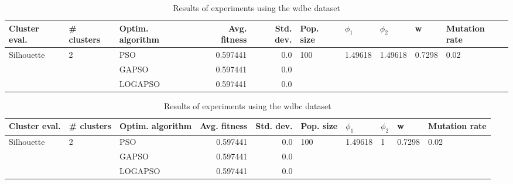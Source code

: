 \documentclass{article}
\begin{document}
\begin{table}
\centering
\caption{Results of experiments using the wdbc dataset}
\begin{tabular}{lllrrlllll}
\toprule
              Cluster eval. &        \# clusters & Optim. algorithm &  Avg. fitness &  Std. dev. &            Pop. size &               $\phi_{1}$ &               $\phi_{2}$ &                       w &         Mutation rate \\
\midrule
\multirow{3}{*}{Silhouette} & \multirow{3}{*}{2} &              PSO &      0.597441 &        0.0 & \multirow{3}{*}{100} & \multirow{3}{*}{1.49618} & \multirow{3}{*}{1.49618} & \multirow{3}{*}{0.7298} & \multirow{3}{*}{0.02} \\
                            &                    &            GAPSO &      0.597441 &        0.0 &                      &                          &                          &                         &                       \\
                            &                    &          LOGAPSO &      0.597441 &        0.0 &                      &                          &                          &                         &                       \\
\bottomrule
\end{tabular}
\end{table}
\begin{table}
\centering
\caption{Results of experiments using the wdbc dataset}
\begin{tabular}{lllrrlllll}
\toprule
              Cluster eval. &        \# clusters & Optim. algorithm &  Avg. fitness &  Std. dev. &            Pop. size &               $\phi_{1}$ &         $\phi_{2}$ &                       w &         Mutation rate \\
\midrule
\multirow{3}{*}{Silhouette} & \multirow{3}{*}{2} &              PSO &      0.597441 &        0.0 & \multirow{3}{*}{100} & \multirow{3}{*}{1.49618} & \multirow{3}{*}{1} & \multirow{3}{*}{0.7298} & \multirow{3}{*}{0.02} \\
                            &                    &            GAPSO &      0.597441 &        0.0 &                      &                          &                    &                         &                       \\
                            &                    &          LOGAPSO &      0.597441 &        0.0 &                      &                          &                    &                         &                       \\
\bottomrule
\end{tabular}
\end{table}
\end{document}
